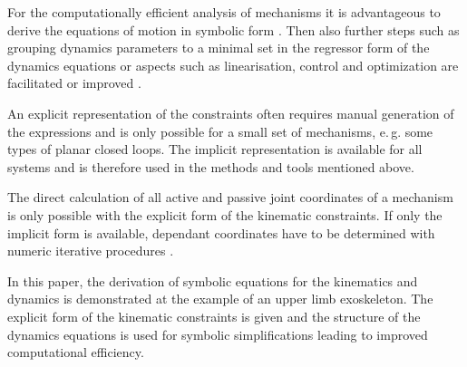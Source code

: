 \documentclass[letterpaper, 10 pt, conference]{ieeeconf}  %
\begin{document}
For the computationally efficient analysis of mechanisms it is advantageous to derive the equations of motion in symbolic form \cite{SaminFis2013}.
Then also further steps such as grouping dynamics parameters to a minimal set  in the regressor form of the dynamics equations \cite{KhalilBen1995} or aspects such as linearisation, control and optimization are facilitated or improved \cite{ParkChoPlo1999}.


An explicit representation of the constraints often requires manual generation of the expressions and is only possible for a small set of mechanisms, e.\,g. some types of planar closed loops.
The implicit representation is available for all systems and is therefore used in the methods and tools mentioned above.


The direct calculation of all active and passive joint coordinates of a mechanism is only possible with the explicit form of the kinematic constraints.
If only the implicit form is available, dependant coordinates have to be determined with numeric iterative procedures \cite{ParkChoPlo1999}.

In this paper, the derivation of symbolic equations for the kinematics and dynamics is demonstrated at the example of an upper limb exoskeleton.
The explicit form of the kinematic constraints is given and the structure of the dynamics equations is used for symbolic simplifications leading to improved computational efficiency.
\end{document}
